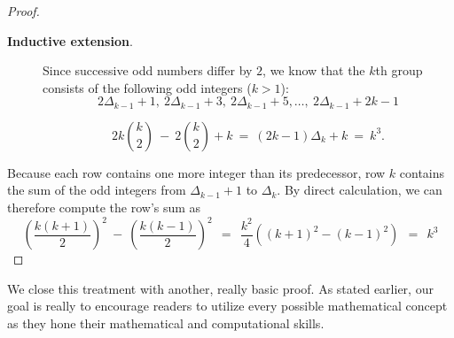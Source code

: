\begin{proof}
\begin{description}
\item[{\bf Inductive extension}.]
%
Since successive odd numbers differ by $2$, we know that the $k$th
group consists of the following odd integers ($k>1$):
\[
2 \Delta_{k-1} +1, \ 2 \Delta_{k-1}  +3, \ 2 \Delta_{k-1}  +5 ,
\ldots, \
2 \Delta_{k-1} +2k-1
\]
\[
2k {k \choose 2} \ - \ 2 {k \choose 2} +k \ = \
(2k -1) \Delta_k + k \ = \ k^3.
\]
\end{description}


Because each row contains one more integer than its predecessor, row
$k$ contains the sum of the odd integers from $\Delta_{k-1}+1$ to
$\Delta_k$.  By direct calculation, we can therefore compute the row's
sum as
\[
\left( \frac{k(k+1)}{2} \right)^2 \ - \ \left( \frac{k(k-1)}{2} \right)^2
 \ \ =  \ \ \frac{k^2}{4} \left( (k+1)^2 - (k-1)^2 \right)
 \ \ = \ \ k^3
\]
\end{proof}

We close this treatment with another, really basic proof.  As stated
earlier, our goal is really to encourage readers to utilize every
possible mathematical concept as they hone their mathematical and
computational skills.

